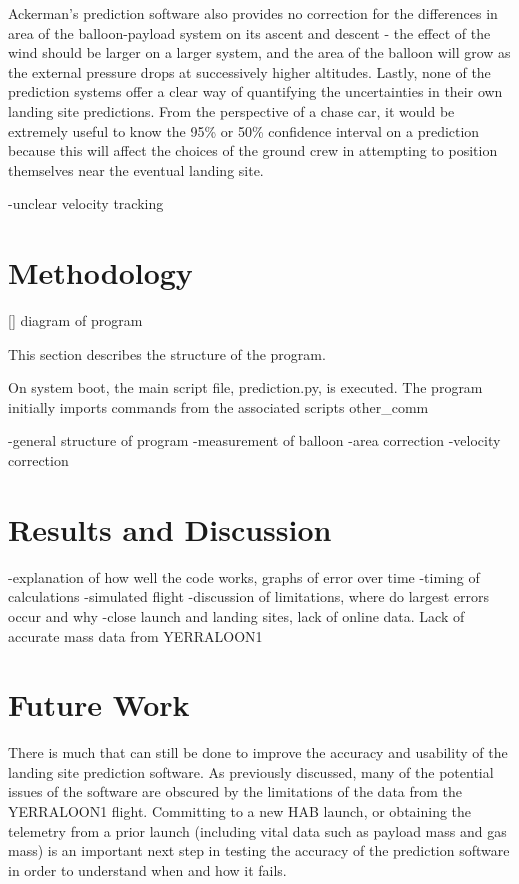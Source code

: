 \documentclass[11pt]{article}
\begin{document}
Ackerman's prediction software also provides no correction for the differences in area of the balloon-payload system on its ascent and descent - the effect of the wind should be larger on a larger system, and the area of the balloon will grow as the external pressure drops at successively higher altitudes. Lastly, none of the prediction systems offer a clear way of quantifying the uncertainties in their own landing site predictions. From the perspective of a chase car, it would be extremely useful to know the 95\% or 50\% confidence interval on a prediction because this will affect the choices of the ground crew in attempting to position themselves near the eventual landing site.

-unclear velocity tracking

\section{Methodology}

[] diagram of program

This section describes the structure of the program. 

On system boot, the main script file, prediction.py, is executed. The program initially imports commands from the associated scripts other_comm

-general structure of program
-measurement of balloon
-area correction
-velocity correction


\section{Results and Discussion}

-explanation of how well the code works, graphs of error over time
-timing of calculations
-simulated flight
-discussion of limitations, where do largest errors occur and why
-close launch and landing sites, lack of online data. Lack of accurate mass data from YERRALOON1

\section{Future Work}

There is much that can still be done to improve the accuracy and usability of the landing site prediction software. As previously discussed, many of the potential issues of the software are obscured by the limitations of the data from the YERRALOON1 flight. Committing to a new HAB launch, or obtaining the telemetry from a prior launch (including vital data such as payload mass and gas mass) is an important next step in testing the accuracy of the prediction software in order to understand when and how it fails. \\
\end{document}
